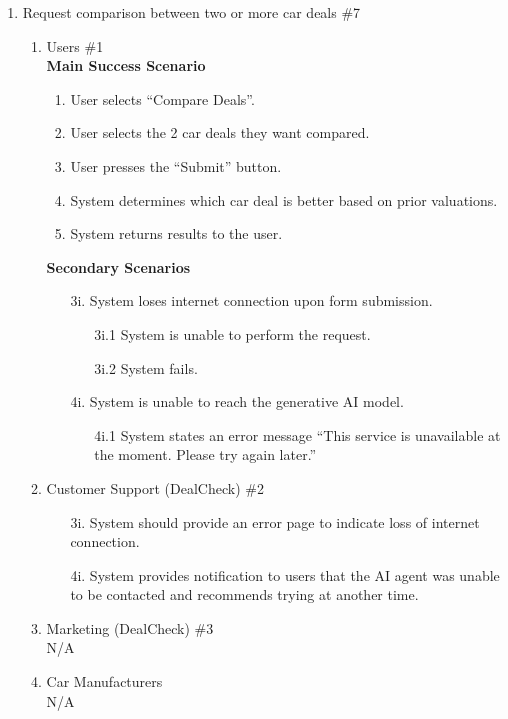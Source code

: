 \documentclass[]{article}
\begin{document}
\begin{enumerate}[{\bf {BE}1.}]
		\item Request comparison between two or more car deals \#7
		\begin{enumerate}[{\bf VP1.}]
		  \item Users \#1 \\
			\textbf{Main Success Scenario}
			\begin{enumerate}[1.]
			  \item User selects ``Compare Deals''.
			  \item User selects the 2 car deals they want compared.
			  \item User presses the ``Submit'' button.
			  \item System determines which car deal is better based on prior valuations.
			  \item System returns results to the user.
			\end{enumerate}
			\textbf{Secondary Scenarios}
			\begin{enumerate}
			  \item[3i.] System loses internet connection upon form submission.
			  \begin{enumerate}
				\item[3i.1] System is unable to perform the request.
				\item[3i.2] System fails.
			  \end{enumerate}
			  \item[4i.] System is unable to reach the generative AI model.
			  \begin{enumerate}
				\item[4i.1] System states an error message ``This service is unavailable at the moment. Please try again later.''
			  \end{enumerate}
			\end{enumerate}
		  \item Customer Support (DealCheck) \#2
			\begin{enumerate}
			  \item[3i.] System should provide an error page to indicate loss of internet connection.
			  \item[4i.] System provides notification to users that the AI agent was unable to be contacted and recommends trying at another time.
			\end{enumerate}
		  \item Marketing (DealCheck) \#3 \\ N/A
		  \item Car Manufacturers \\ N/A

\end{enumerate}
\end{enumerate}
\end{document}
